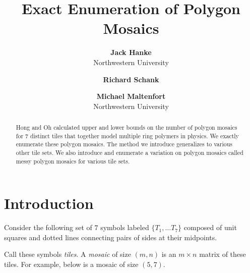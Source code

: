 \documentclass[12pt]{article}
\date{}
\author{
    \textbf{Jack Hanke}\\
    Northwestern University
    \and
    \textbf{Richard Schank}\\
    \and
    \textbf{Michael Maltenfort}\\
    Northwestern University
    }
\title{\textbf{Exact Enumeration of Polygon Mosaics}}
\theoremstyle{plain}
\theoremstyle{definition}
\theoremstyle{remark}
\theoremstyle{definition}
\newcommand{\cell}[4]{ \draw[thick] ( #1 , #2 ) rectangle ( #3 , #4 );}
\newcommand{\cellA}[4]{ \draw[thick] ( #1 , #2 ) rectangle ( #3 , #4 ); \draw[red, thick, densely dotted] (#3 * 0.5 + #1 * 0.5 , #2) -- (#3, #4 * 0.5 + #2 * 0.5);}
\newcommand{\cellB}[4]{ \draw[thick] ( #1 , #2 ) rectangle ( #3 , #4 ); \draw[red, thick, densely dotted] (#3 * 0.5 + #1 * 0.5 , #2) -- (#1, #4 * 0.5 + #2 * 0.5);}
\newcommand{\cellC}[4]{ \draw[thick] ( #1 , #2 ) rectangle ( #3 , #4 ); \draw[red, thick, densely dotted] (#3 * 0.5 + #1 * 0.5 , #4) -- (#1, #4 * 0.5 + #2 * 0.5);}
\newcommand{\cellD}[4]{ \draw[thick] ( #1 , #2 ) rectangle ( #3 , #4 ); \draw[red, thick, densely dotted] (#3 * 0.5 + #1 * 0.5 , #4) -- (#3, #4 * 0.5 + #2 * 0.5);}
\newcommand{\cellE}[4]{ \draw[thick] ( #1 , #2 ) rectangle ( #3 , #4 ); \draw[red, thick, densely dotted] (#3 * 0.5 + #1 * 0.5 , #2) -- (#3 * 0.5 + #1 * 0.5 , #4);}
\newcommand{\cellF}[4]{ \draw[thick] ( #1 , #2 ) rectangle ( #3 , #4 ); \draw[red, thick, densely dotted] (#3, #4 * 0.5 + #2 * 0.5) -- (#1, #4 * 0.5 + #2 * 0.5);}
\newcommand{\lablnode}[3]{\node[shape=circle,draw=none,fill=none, inner sep=0pt,minimum size=5pt] (A) at ( #1 , #2 ) {#3};}
\begin{document}
\maketitle

\begin{center}

    \begin{abstract}
        Hong and Oh calculated upper and lower bounds on the number of polygon mosaics for $7$ distinct tiles that together model multiple ring polymers in physics. We exactly enumerate these polygon mosaics. The method we introduce generalizes to various other tile sets. We also introduce and enumerate a variation on polygon mosaics called messy polygon mosaics for various tile sets.
    \end{abstract}

\end{center}

\section{Introduction}

Consider the following set of $7$ symbols labeled $\{ T_1, \dots T_7 \}$ composed of unit squares and dotted lines connecting pairs of sides at their midpoints.

\begin{center}
\end{center}

Call these symbols \textit{tiles}. A \textit{mosaic} of size $(m,n)$ is an $m \times n$ matrix of these tiles. For example, below is a mosaic of size $(5,7)$.
\end{document}
